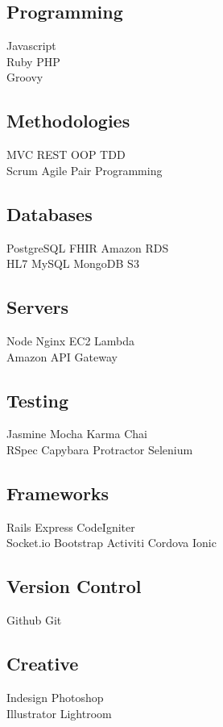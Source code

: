 \documentclass[]{deedy-resume-openfont}
\begin{document}
\begin{minipage}[t]{0.33\textwidth}
\subsection{Programming}
Javascript \\
Ruby \textbullet{} PHP \\
Groovy
\sectionsep

\subsection{Methodologies}
MVC \textbullet{} REST \textbullet{} OOP \textbullet{} TDD \\
Scrum \textbullet{} Agile \textbullet{} Pair Programming
\sectionsep

\subsection{Databases}
PostgreSQL \textbullet{}   FHIR \textbullet{} Amazon RDS \\
HL7 \textbullet{} MySQL \textbullet{} MongoDB \textbullet{} S3
\sectionsep

\subsection{Servers}
Node \textbullet{} Nginx \textbullet{} EC2 \textbullet{} Lambda \\ Amazon API Gateway
\sectionsep

\subsection{Testing}
Jasmine \textbullet{} Mocha \textbullet{} Karma \textbullet{} Chai \\
RSpec \textbullet{} Capybara \textbullet{} Protractor \textbullet{} Selenium
\sectionsep

\subsection{Frameworks}
Rails \textbullet{} Express \textbullet{} CodeIgniter \\
Socket.io \textbullet{} Bootstrap \textbullet{} Activiti
Cordova \textbullet{} Ionic
\sectionsep

\subsection{Version Control}
Github \textbullet{} Git
\sectionsep

\subsection{Creative}
Indesign \textbullet{} Photoshop \\
Illustrator \textbullet{} Lightroom
\sectionsep

%
%

\end{minipage}
\end{document}
